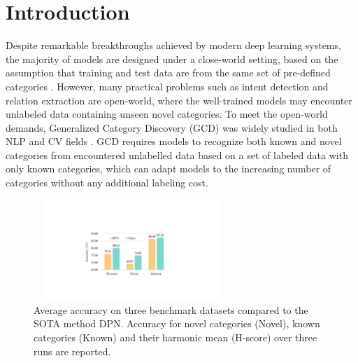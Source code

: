 \documentclass[letterpaper]{article} %
\begin{document}
\section{Introduction}
Despite remarkable breakthroughs achieved by modern deep learning systems, the majority of models are designed under a close-world setting, based on the assumption that training and test data are from the same set of pre-defined categories \citep{openworld}. However, many practical problems such as intent detection \citep{thu2020} and relation extraction \citep{hogan2023open} are open-world, where the well-trained models may encounter unlabeled data containing unseen novel categories.
To meet the open-world demands, Generalized Category Discovery (GCD) was widely studied in both NLP \citep{thu2021,dpn} and CV fields \citep{gcd,simple}. 
GCD requires models to recognize both known and novel categories from encountered unlabelled data based on a set of labeled data with only known categories, which can adapt models to the increasing number of categories without any additional labeling cost.

\begin{figure}
\centering
\includegraphics[width=7.5cm, height=3.8cm]{intro.pdf}
\caption{Average accuracy on three benchmark datasets compared to the SOTA method DPN. Accuracy for novel categories (Novel), known categories (Known) and their harmonic mean (H-score) over three runs are reported.} 
\label{fig1}
\end{figure}
\end{document}
